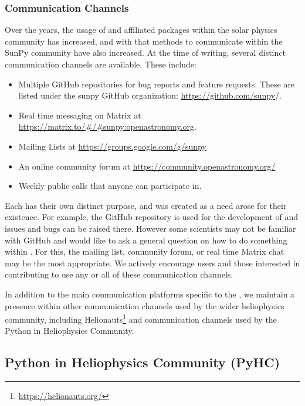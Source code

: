 \subsubsection{Communication Channels}
\label{sec:communication_channels}
Over the years, the usage of \sunpypkg and affiliated packages within the solar physics community has increased, and with that methods to communicate within the SunPy community have also increased. 
At the time of writing, several distinct communication channels are available.
These include:

\begin{itemize}
    \item Multiple GitHub repositories for bug reports and feature requests. These are listed under the sunpy GitHub organization: \url{https://github.com/sunpy}/.
    \item Real time messaging on Matrix at \url{https://matrix.to/#/#sunpy:openastronomy.org}.
    \item Mailing Lists at \url{https://groups.google.com/g/sunpy}
    \item An online community forum at \url{https://community.openastronomy.org/}
    \item Weekly public calls that anyone can participate in.
\end{itemize}

Each has their own distinct purpose, and was created as a need arose for their existence.
For example, the GitHub repository is used for the development of \sunpypkg and issues and bugs can be raised there.
However some scientists may not be familiar with GitHub and would like to ask a general question on how to do something within \sunpypkg. 
For this, the mailing list, community forum, or real time Matrix chat may be the most appropriate.
We actively encourage users and those interested in contributing to use any or all of these communication channels. 

In addition to the main communication platforms specific to the \sunpyproj, we maintain a presence within other communication channels used by the wider heliophysics community, including Helionauts\footnote{\url{https://helionauts.org/}} and communication channels used by the Python in Heliophysics Community.

\subsection{Python in Heliophysics Community (PyHC)}

